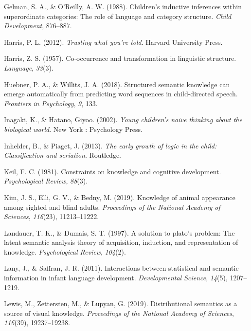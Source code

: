 \documentclass[english,,man,floatsintext]{apa6}
\begin{document}
\leavevmode\hypertarget{ref-gelman1988}{}%
Gelman, S. A., \& O'Reilly, A. W. (1988). Children's inductive inferences within superordinate categories: The role of language and category structure. \emph{Child Development}, 876--887.

\leavevmode\hypertarget{ref-harris2012}{}%
Harris, P. L. (2012). \emph{Trusting what you're told}. Harvard University Press.

\leavevmode\hypertarget{ref-harris1957}{}%
Harris, Z. S. (1957). Co-occurrence and transformation in linguistic structure. \emph{Language}, \emph{33}(3).

\leavevmode\hypertarget{ref-huebner2018}{}%
Huebner, P. A., \& Willits, J. A. (2018). Structured semantic knowledge can emerge automatically from predicting word sequences in child-directed speech. \emph{Frontiers in Psychology}, \emph{9}, 133.

\leavevmode\hypertarget{ref-inagaki2002}{}%
Inagaki, K., \& Hatano, Giyoo. (2002). \emph{Young children's naive thinking about the biological world}. New York : Psychology Press.

\leavevmode\hypertarget{ref-inhelder2013}{}%
Inhelder, B., \& Piaget, J. (2013). \emph{The early growth of logic in the child: Classification and seriation}. Routledge.

\leavevmode\hypertarget{ref-keil1981}{}%
Keil, F. C. (1981). Constraints on knowledge and cognitive development. \emph{Psychological Review}, \emph{88}(3).

\leavevmode\hypertarget{ref-kim2019}{}%
Kim, J. S., Elli, G. V., \& Bedny, M. (2019). Knowledge of animal appearance among sighted and blind adults. \emph{Proceedings of the National Academy of Sciences}, \emph{116}(23), 11213--11222.

\leavevmode\hypertarget{ref-landauer1997}{}%
Landauer, T. K., \& Dumais, S. T. (1997). A solution to plato's problem: The latent semantic analysis theory of acquisition, induction, and representation of knowledge. \emph{Psychological Review}, \emph{104}(2).

\leavevmode\hypertarget{ref-lany2011}{}%
Lany, J., \& Saffran, J. R. (2011). Interactions between statistical and semantic information in infant language development. \emph{Developmental Science}, \emph{14}(5), 1207--1219.

\leavevmode\hypertarget{ref-lewis2019}{}%
Lewis, M., Zettersten, M., \& Lupyan, G. (2019). Distributional semantics as a source of visual knowledge. \emph{Proceedings of the National Academy of Sciences}, \emph{116}(39), 19237--19238.
\end{document}
